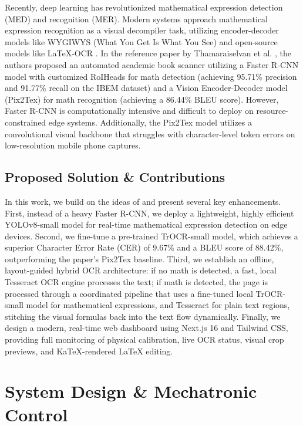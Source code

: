 \documentclass[conference]{IEEEtran}
\begin{document}
Recently, deep learning has revolutionized mathematical expression detection (MED) and recognition (MER). Modern systems approach mathematical expression recognition as a visual decompiler task, utilizing encoder-decoder models like WYGIWYS (What You Get Is What You See) \cite{wygiwys} and open-source models like LaTeX-OCR \cite{latexocr}. In the reference paper by Thamaraiselvan et al. \cite{ref_paper}, the authors proposed an automated academic book scanner utilizing a Faster R-CNN model with customized RoIHeads for math detection (achieving 95.71\% precision and 91.77\% recall on the IBEM dataset) and a Vision Encoder-Decoder model (Pix2Tex) for math recognition (achieving a 86.44\% BLEU score). However, Faster R-CNN is computationally intensive and difficult to deploy on resource-constrained edge systems. Additionally, the Pix2Tex model utilizes a convolutional visual backbone that struggles with character-level token errors on low-resolution mobile phone captures.

\subsection{Proposed Solution \& Contributions}
In this work, we build on the ideas of \cite{ref_paper} and present several key enhancements. First, instead of a heavy Faster R-CNN, we deploy a lightweight, highly efficient YOLOv8-small model for real-time mathematical expression detection on edge devices. Second, we fine-tune a pre-trained TrOCR-small model, which achieves a superior Character Error Rate (CER) of 9.67\% and a BLEU score of 88.42\%, outperforming the paper's Pix2Tex baseline. Third, we establish an offline, layout-guided hybrid OCR architecture: if no math is detected, a fast, local Tesseract OCR engine processes the text; if math is detected, the page is processed through a coordinated pipeline that uses a fine-tuned local TrOCR-small model for mathematical expressions, and Tesseract for plain text regions, stitching the visual formulas back into the text flow dynamically. Finally, we design a modern, real-time web dashboard using Next.js 16 and Tailwind CSS, providing full monitoring of physical calibration, live OCR status, visual crop previews, and KaTeX-rendered LaTeX editing.

\section{System Design \& Mechatronic Control}
\label{sec:method}
\end{document}
